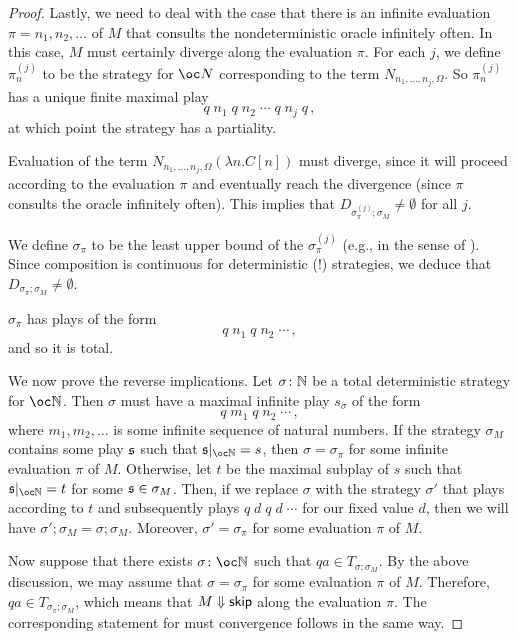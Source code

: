 \documentclass[sigplan,10pt,review]{acmart}\settopmatter{printfolios=true,printccs=false,printacmref=false}
\begin{document}
\begin{proof}
  Lastly, we need to deal with the case that there is an infinite evaluation $\pi = n_1,n_2,\dots$ of $M$ that consults the nondeterministic oracle infinitely often.
  In this case, $M$ must certainly diverge along the evaluation $\pi$.
  For each $j$, we define $\pi_n^{(j)}$ to be the strategy for $\oc N$ corresponding to the term $N_{n_1,\dots,n_j,\Omega}$.  
  So $\pi_n^{(j)}$ has a unique finite maximal play
  \[
    q\;n_1\;q\;n_2\;\cdots\;q\;n_j\;q\,,
    \]
  at which point the strategy has a partiality.  

  Evaluation of the term $N_{n_1,\dots,n_j,\Omega} (\lambda n.C[n])$ must diverge, since it will proceed according to the evaluation $\pi$ and eventually reach the divergence (since $\pi$ consults the oracle infinitely often).  
  This implies that $D_{\sigma_\pi^{(j)};\sigma_M}\ne\emptyset$ for all $j$.

  We define $\sigma_\pi$ to be the least upper bound of the $\sigma_\pi^{(j)}$ (e.g., in the sense of \cite{mcCHFiniteND}).  
  Since composition is continuous for deterministic (!) strategies, we deduce that $D_{\sigma_\pi;\sigma_M}\ne\emptyset$.

  $\sigma_\pi$ has plays of the form
  \[
    q\;n_1\;q\;n_2\;\cdots\,,
    \]
  and so it is total.

  We now prove the reverse implications.  
  Let $\sigma\colon\mathbb{N}$ be a total deterministic strategy for $\oc\bN$.
  Then $\sigma$ must have a maximal infinite play $s_\sigma$ of the form
  \[
    q\;m_1\;q\;n_2\;\cdots\,,
    \]
  where $m_1,m_2,\dots$ is some infinite sequence of natural numbers.  
  If the strategy $\sigma_M$ contains some play $\mathfrak s$ such that $\s\vert_{\oc\bN}=s$, then $\sigma=\sigma_\pi$ for some infinite evaluation $\pi$ of $M$.  
  Otherwise, let $t$ be the maximal subplay of $s$ such that $\s\vert_{\oc\bN}=t$ for some $\mathfrak s\in\sigma_M$.  
  Then, if we replace $\sigma$ with the strategy $\sigma'$ that plays according to $t$ and subsequently plays $q\;d\;q\;d\;\cdots$ for our fixed value $d$, then we will have $\sigma';\sigma_M=\sigma;\sigma_M$.  
  Moreover, $\sigma'=\sigma_\pi$ for some evaluation $\pi$ of $M$.

  Now suppose that there exists $\sigma\from\oc\bN$ such that $qa\in T_{\sigma;\sigma_M}$.  
  By the above discussion, we may assume that $\sigma=\sigma_\pi$ for some evaluation $\pi$ of $M$.  
  Therefore, $qa\in T_{\sigma_\pi;\sigma_M}$, which means that $M\Downarrow{\mathsf{skip}}$ along the evaluation $\pi$.  
  The corresponding statement for must convergence follows in the same way.
\end{proof}
\end{document}
